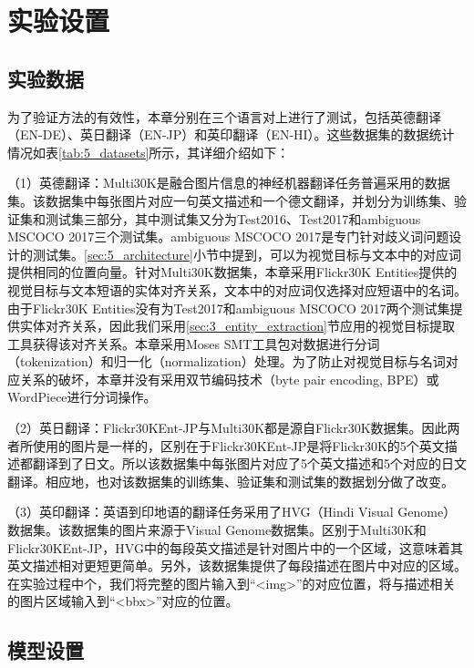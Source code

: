 \section{实验设置}
\label{sec:5_setup}

\subsection{实验数据}
\label{sec:5_datasets}

为了验证方法的有效性，本章分别在三个语言对上进行了测试，包括英德翻译（EN-DE）、英日翻译（EN-JP）和英印翻译（EN-HI）。这些数据集的数据统计情况如表\ref{tab:5_datasets}所示，其详细介绍如下：

（1）{\sffamily 英德翻译：}Multi30K是融合图片信息的神经机器翻译任务普遍采用的数据集。该数据集中每张图片对应一句英文描述和一个德文翻译，并划分为训练集、验证集和测试集三部分，其中测试集又分为Test2016、Test2017和ambiguous MSCOCO 2017三个测试集。ambiguous MSCOCO 2017是专门针对歧义词问题设计的测试集。\ref{sec:5_architecture}小节中提到，可以为视觉目标与文本中的对应词提供相同的位置向量。针对Multi30K数据集，本章采用Flickr30K Entities提供的视觉目标与文本短语的实体对齐关系，文本中的对应词仅选择对应短语中的名词。由于Flickr30K Entities没有为Test2017和ambiguous MSCOCO 2017两个测试集提供实体对齐关系，因此我们采用\ref{sec:3_entity_extraction}节应用的视觉目标提取工具获得该对齐关系。本章采用Moses SMT\cite{44_koehn-etal-2007-moses}工具包对数据进行分词（tokenization）和归一化（normalization）处理。为了防止对视觉目标与名词对应关系的破坏，本章并没有采用双节编码技术\cite{27_sennrich-etal-2016-neural}（byte pair encoding, BPE）或WordPiece\cite{28_DBLP:journals/corr/WuSCLNMKCGMKSJL16}进行分词操作。

（2）{\sffamily 英日翻译：}Flickr30KEnt-JP与Multi30K都是源自Flickr30K数据集。因此两者所使用的图片是一样的，区别在于Flickr30KEnt-JP是将Flickr30K的5个英文描述都翻译到了日文。所以该数据集中每张图片对应了5个英文描述和5个对应的日文翻译。相应地，也对该数据集的训练集、验证集和测试集的数据划分做了改变。

（3）{\sffamily 英印翻译：}英语到印地语的翻译任务采用了HVG（Hindi Visual Genome）数据集。该数据集的图片来源于Visual Genome数据集。区别于Multi30K和Flickr30KEnt-JP，HVG中的每段英文描述是针对图片中的一个区域，这意味着其英文描述相对更短更简单。另外，该数据集提供了每段描述在图片中对应的区域。在实验过程中个，我们将完整的图片输入到“<img>”的对应位置，将与描述相关的图片区域输入到“<bbx>”对应的位置。

\subsection{模型设置}
\label{sec:5_model_setup}

